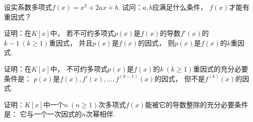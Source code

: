 \begin{example}
设实系数多项式\(f(x)=x^3+2ax+b\).
试问：\(a,b\)应满足什么条件，
\(f(x)\)才能有重因式？
\begin{solution}

\end{solution}
\end{example}

\begin{example}
证明：在\(K[x]\)中，
若不可约多项式\(p(x)\)是\(f(x)\)的导数\(f'(x)\)的\(k-1\ (k\geq1)\)重因式，
并且\(p(x)\)是\(f(x)\)的因式，
则\(p(x)\)是\(f(x)\)的\(k\)重因式.
\end{example}

\begin{example}
证明：在\(K[x]\)中，
不可约多项式\(p(x)\)是\(f(x)\)的\(k\ (k\geq1)\)重因式的充分必要条件是：
\(p(x)\)是\(f(x),f'(x),\dotsc,f^{(k-1)}(x)\)的因式，
但不是\(f^{(k)}(x)\)的因式.
\end{example}

\begin{example}
证明：\(K[x]\)中一个\(n\ (n\geq1)\)次多项式\(f(x)\)能被它的导数整除的充分必要条件是：
它与一个一次因式的\(n\)次幂相伴.
\end{example}
